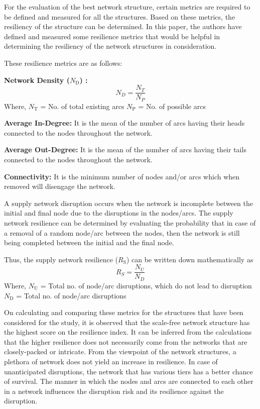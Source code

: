 \newpage
For the evaluation of the best network structure, certain metrics are required to be defined and measured for all the structures. Based on these metrics, the resiliency of the structure can be determined. In this paper, the authors have defined and measured some resilience metrics that would be helpful in determining the resiliency of the network structures in consideration.

These resilience metrics are as follows:


\textbf{Network Density ($N_{\text{D}}$) :}
\begin{equation}
    N_D = \frac{N_T}{N_P}
\end{equation}
\newline
Where,
\newline
  $N_{\text{T}}$ = No. of total existing arcs
\newline  
 $N_{\text{P}}$ = No. of possible arcs
 

\textbf{Average In-Degree:} It is the mean of the number of arcs having their heads connected to the nodes throughout the network.

\textbf{Average Out-Degree:} It is the mean of the number of arcs having their tails connected to the nodes throughout the network.

\textbf{Connectivity:} It is the minimum number of nodes and/or arcs which when removed will disengage the network.

A supply network disruption occurs when the network is incomplete between the initial and final node due to the disruptions in the nodes/arcs. The supply network resilience can be determined by evaluating the probability that in case of a removal of a random node/arc between the nodes, then the network is still being completed between the initial and the final node.


Thus, the supply network resilience ($R_{\text{S}}$) can be written down mathematically as
\begin{equation}
   R_S = \frac{N_U}{N_D}
\end{equation}
Where,
\newline
$N_{\text{U}}$ = Total no. of node/arc disruptions, which do not lead to disruption
\newline
$N_{\text{D}}$ = Total no. of node/arc disruptions

On calculating and comparing these metrics for the structures that have been considered for the study, it is observed that the scale-free network structure has the highest score on the resilience index. It can be inferred from the calculations that the higher resilience does not necessarily come from the networks that are closely-packed or intricate. From the viewpoint of the network structures, a plethora of network does not yield an increase in resilience. In case of unanticipated disruptions, the network that has various tiers has a better chance of survival. The manner in which the nodes and arcs are connected to each other in a network influences the disruption risk and its resilience against the disruption.

